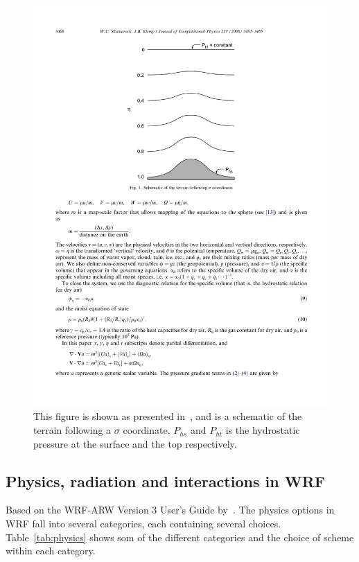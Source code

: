 \begin{figure}
\centering
\includegraphics[scale=1]{model_methods/sigma.pdf}
\caption{This figure is shown as presented in~\citet{Skamarock2008}, and is a schematic of the terrain following a $\sigma$ coordinate. $P_{hs}$ and $P_{ht}$ is the hydrostatic pressure at the surface and the top respectively.}
\label{fig:sigma}
\end{figure}

\subsection{Physics, radiation and interactions in WRF}
Based on the WRF-ARW Version 3 User's Guide by~\citet{Wang2015}.
The physics options in WRF fall into several categories, each containing several choices. Table~\ref{tab:physics} shows som of the different categories and the choice of scheme within each category.

